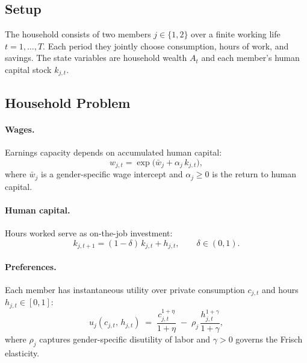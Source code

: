 \subsection{Setup}

The household consists of two members $j \in \{1,2\}$ over a finite working life $t = 1, \dots, T$.
Each period they jointly choose consumption, hours of work, and savings.
The state variables are household wealth $A_t$ and each member's human capital stock $k_{j,t}$.

\subsection{Household Problem}

\paragraph{Wages.} Earnings capacity depends on accumulated human capital:
\begin{equation}
    w_{j,t} = \exp\!\bigl(\bar{w}_j + \alpha_j \, k_{j,t}\bigr),
\end{equation}
where $\bar{w}_j$ is a gender-specific wage intercept and $\alpha_j \geq 0$ is the return to human capital.

\paragraph{Human capital.} Hours worked serve as on-the-job investment:
\begin{equation}
    k_{j,t+1} = (1-\delta)\,k_{j,t} + h_{j,t}, \qquad \delta \in (0,1).
\end{equation}

\paragraph{Preferences.} Each member has instantaneous utility over private consumption $c_{j,t}$ and hours $h_{j,t} \in [0,1]$:
\begin{equation}
    u_j(c_{j,t},\, h_{j,t}) \;=\; \frac{c_{j,t}^{1+\eta}}{1+\eta} \;-\; \rho_j\,\frac{h_{j,t}^{1+\gamma}}{1+\gamma},
\end{equation}
where $\rho_j$ captures gender-specific disutility of labor and $\gamma > 0$ governs the Frisch elasticity.

